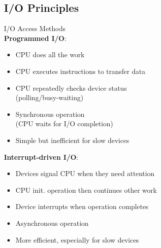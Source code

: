 \subsection{I/O Principles}


\begin{definition}{I/O Access Methods}\\
    \textbf{Programmed I/O}:
            \begin{itemize}
                \item CPU does all the work
                \item CPU executes instructions to transfer data
                \item CPU repeatedly checks device status \\ (polling/busy-waiting)
                \item Synchronous operation \\ (CPU waits for I/O completion)
                \item Simple but inefficient for slow devices
            \end{itemize}
    \textbf{Interrupt-driven I/O}:
            \begin{itemize}
                \item Devices signal CPU when they need attention
                \item CPU init. operation then continues other work
                \item Device interrupts when operation completes
                \item Asynchronous operation
                \item More efficient, especially for slow devices
            \end{itemize}
\end{definition}

